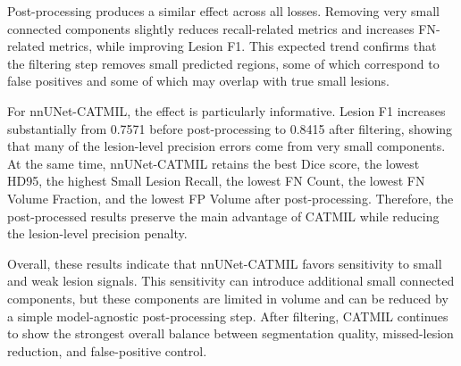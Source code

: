 \begin{center}
\label{tab:loss_comparison_small_lesion_pp5}
\end{center}

Post-processing produces a similar effect across all losses. Removing
very small connected components slightly reduces recall-related metrics
and increases FN-related metrics, while improving Lesion F1. This
expected trend confirms that the filtering step removes small predicted
regions, some of which correspond to false positives and some of which may
overlap with true small lesions.

For nnUNet-CATMIL, the effect is particularly informative. Lesion F1
increases substantially from 0.7571 before post-processing to 0.8415
after filtering, showing that many of the lesion-level precision errors
come from very small components. At the same time, nnUNet-CATMIL retains
the best Dice score, the lowest HD95, the highest Small Lesion Recall,
the lowest FN Count, the lowest FN Volume Fraction, and the lowest FP
Volume after post-processing. Therefore, the post-processed results
preserve the main advantage of CATMIL while reducing the lesion-level
precision penalty.

Overall, these results indicate that nnUNet-CATMIL favors sensitivity to
small and weak lesion signals. This sensitivity can introduce additional
small connected components, but these components are limited in volume and
can be reduced by a simple model-agnostic post-processing step. After
filtering, CATMIL continues to show the strongest overall balance between
segmentation quality, missed-lesion reduction, and false-positive control.